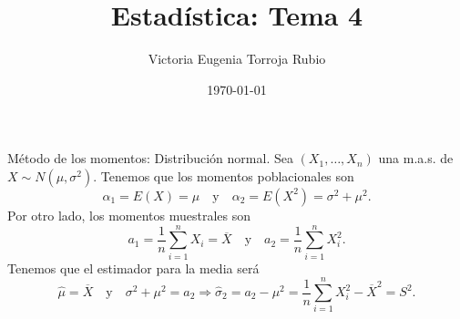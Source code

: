 \documentclass{article}
\begin{document}
\title{Estadística: Tema 4}
\author{Victoria Eugenia Torroja Rubio}
\date{\today}

\maketitle

\begin{ej}
Método de los momentos: Distribución normal. Sea $\displaystyle \left(X_{1}, \ldots, X_{n}\right) $ una m.a.s. de $\displaystyle X \sim N\left(\mu, \sigma^{2}\right) $. Tenemos que los momentos poblacionales son
\[\alpha_{1}=E\left(X\right)=\mu \quad \text{y} \quad \alpha_{2} = E\left(X^{2}\right)=\sigma^{2} + \mu^{2} .\]
Por otro lado, los momentos muestrales son
\[a_{1}=\frac{1}{n}\sum^{n}_{i = 1}X_{i}=\overline{X} \quad \text{y} \quad a_{2}=\frac{1}{n}\sum^{n}_{i = 1}X_{i}^{2} .\]
Tenemos que el estimador para la media será
\[\hat{\mu}=\overline{X} \quad \text{y} \quad \sigma^{2} + \mu^{2} = a_{2} \Rightarrow \hat{\sigma }_{2}=a_{2}-\mu^{2} = \frac{1}{n}\sum^{n}_{i =1}X_{i}^{2}-\overline{X}^{2} = S^{2} .\]
\end{ej}
\begin{ej}

\end{ej}
\end{document}
